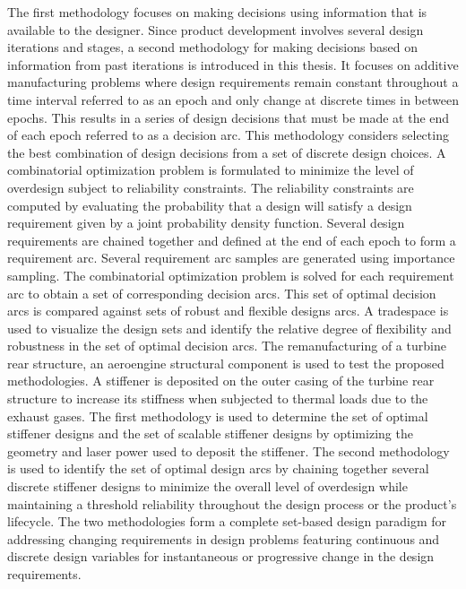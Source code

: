 \documentclass[12pt,Bold,letterpaper,TexShade,twoside]{mcgilletdclass}
\begin{document}
\begin{romanPagenumber}{2}
{The first methodology focuses on making decisions using information that is available to the designer. Since product development involves several design iterations and stages, a second methodology for making decisions based on information from past iterations is introduced in this thesis. It focuses on additive manufacturing problems where design requirements remain constant throughout a time interval referred to as an epoch and only change at discrete times in between epochs. This results in a series of design decisions that must be made at the end of each epoch referred to as a decision arc. This methodology considers selecting the best combination of design decisions from a set of discrete design choices. A combinatorial optimization problem is formulated to minimize the level of overdesign subject to reliability constraints. The reliability constraints are computed by evaluating the probability that a design will satisfy a design requirement given by a joint probability density function. Several design requirements are chained together and defined at the end of each epoch to form a requirement arc. Several requirement arc samples are generated using importance sampling. The combinatorial optimization problem is solved for each requirement arc to obtain a set of corresponding decision arcs. This set of optimal decision arcs is compared against sets of robust and flexible designs arcs. A tradespace is used to visualize the design sets and identify the relative degree of flexibility and robustness in the set of optimal decision arcs.
The remanufacturing of a turbine rear structure, an aeroengine structural component is used to test the proposed methodologies. A stiffener is deposited on the outer casing of the turbine rear structure to increase its stiffness when subjected to thermal loads due to the exhaust gases. The first methodology is used to determine the set of optimal stiffener designs and the set of scalable stiffener designs by optimizing the geometry and laser power used to deposit the stiffener. The second methodology is used to identify the set of optimal design arcs by chaining together several discrete stiffener designs to minimize the overall level of overdesign while maintaining a threshold reliability throughout the design process or the product’s lifecycle.
The two methodologies form a complete set-based design paradigm for addressing changing requirements in design problems featuring continuous and discrete design variables for instantaneous or progressive change in the design requirements.}
\AbstractEn%

\begin{otherlanguage}{french} 
%
\SetAbstractFrText{~~}%
\AbstractFr%
\end{otherlanguage}
%
%
%
\tableofcontents %
\listoftables %
\listoffigures %

\end{romanPagenumber}
\end{document}
